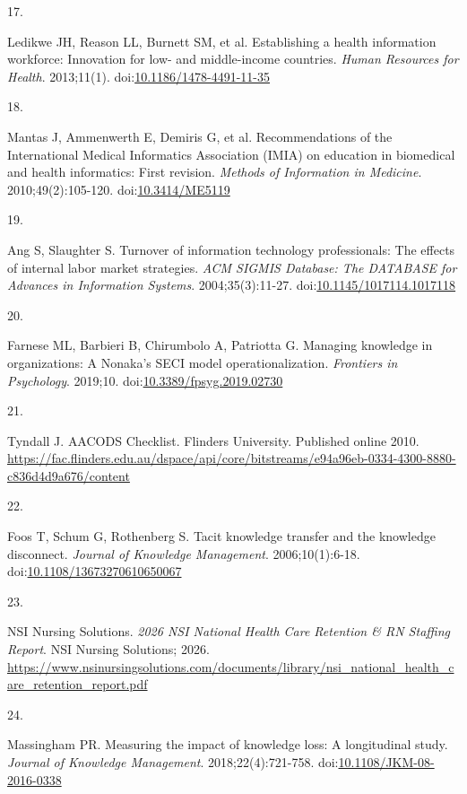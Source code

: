 \documentclass[
  american,
  11pt,
  letterpaper,
  oneside  ,captions=tableheading
]{scrartcl}
\newlength{\cslhangindent}
\newlength{\csllabelwidth}
\newenvironment{CSLReferences}[2] %
 {\begin{list}{}{%
  \setlength{\itemindent}{0pt}
  \setlength{\leftmargin}{0pt}
  \setlength{\parsep}{0pt}
  \ifodd #1
   \setlength{\leftmargin}{\cslhangindent}
   \setlength{\itemindent}{-1\cslhangindent}
  \fi
  \setlength{\itemsep}{#2\baselineskip}}}
 {\end{list}}
\newcommand{\CSLLeftMargin}[1]{\parbox[t]{\csllabelwidth}{\strut#1\strut}}
\newcommand{\CSLRightInline}[1]{\parbox[t]{\linewidth - \csllabelwidth}{\strut#1\strut}}
\begin{document}
\begin{CSLReferences}{0}{1}
\CSLLeftMargin{17. }%
\CSLRightInline{Ledikwe JH, Reason LL, Burnett SM, et al. {Establishing
a health information workforce: Innovation for low- and middle-income
countries}. \emph{Human Resources for Health}. 2013;11(1).
doi:\href{https://doi.org/10.1186/1478-4491-11-35}{10.1186/1478-4491-11-35}}

\CSLLeftMargin{18. }%
\CSLRightInline{Mantas J, Ammenwerth E, Demiris G, et al.
{Recommendations of the International Medical Informatics Association
(IMIA) on education in biomedical and health informatics: First
revision}. \emph{Methods of Information in Medicine}.
2010;49(2):105-120.
doi:\href{https://doi.org/10.3414/ME5119}{10.3414/ME5119}}

\CSLLeftMargin{19. }%
\CSLRightInline{Ang S, Slaughter S. {Turnover of information technology
professionals: The effects of internal labor market strategies}.
\emph{{ACM} {SIGMIS} Database: The {DATABASE} for Advances in
Information Systems}. 2004;35(3):11-27.
doi:\href{https://doi.org/10.1145/1017114.1017118}{10.1145/1017114.1017118}}

\CSLLeftMargin{20. }%
\CSLRightInline{Farnese ML, Barbieri B, Chirumbolo A, Patriotta G.
{Managing knowledge in organizations: A Nonaka's {SECI} model
operationalization}. \emph{Frontiers in Psychology}. 2019;10.
doi:\href{https://doi.org/10.3389/fpsyg.2019.02730}{10.3389/fpsyg.2019.02730}}

\CSLLeftMargin{21. }%
\CSLRightInline{Tyndall J. {{AACODS} Checklist. Flinders University}.
Published online 2010.
\url{https://fac.flinders.edu.au/dspace/api/core/bitstreams/e94a96eb-0334-4300-8880-c836d4d9a676/content}}

\CSLLeftMargin{22. }%
\CSLRightInline{Foos T, Schum G, Rothenberg S. {Tacit knowledge transfer
and the knowledge disconnect}. \emph{Journal of Knowledge Management}.
2006;10(1):6-18.
doi:\href{https://doi.org/10.1108/13673270610650067}{10.1108/13673270610650067}}

\CSLLeftMargin{23. }%
\CSLRightInline{NSI Nursing Solutions. \emph{{2026 NSI National Health
Care Retention \& RN Staffing Report}}. NSI Nursing Solutions; 2026.
\url{https://www.nsinursingsolutions.com/documents/library/nsi_national_health_care_retention_report.pdf}}

\CSLLeftMargin{24. }%
\CSLRightInline{Massingham PR. {Measuring the impact of knowledge loss:
A longitudinal study}. \emph{Journal of Knowledge Management}.
2018;22(4):721-758.
doi:\href{https://doi.org/10.1108/JKM-08-2016-0338}{10.1108/JKM-08-2016-0338}}


\end{CSLReferences}
\end{document}
